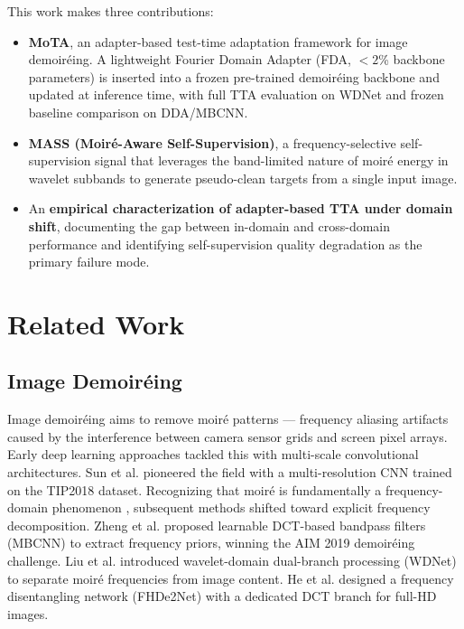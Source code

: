 \documentclass[review,10pt]{elsarticle}
\begin{document}
This work makes three contributions:
\begin{itemize}\raggedright
    \item \textbf{MoTA}, an adapter-based test-time adaptation framework for image demoir\'{e}ing. A lightweight Fourier Domain Adapter (FDA, ${<}2$\% backbone parameters) is inserted into a frozen pre-trained demoir\'{e}ing backbone and updated at inference time, with full TTA evaluation on WDNet and frozen baseline comparison on DDA/MBCNN.
    \item \textbf{MASS (Moir\'{e}-Aware Self-Supervision)}, a frequency-selective self-supervision signal that leverages the band-limited nature of moir\'{e} energy in wavelet subbands to generate pseudo-clean targets from a single input image.
    \item An \textbf{empirical characterization of adapter-based TTA under domain shift}, documenting the gap between in-domain and cross-domain performance and identifying self-supervision quality degradation as the primary failure mode.
\end{itemize}

\section{Related Work}

\subsection{Image Demoir\'{e}ing}

Image demoir\'{e}ing aims to remove moir\'{e} patterns --- frequency aliasing artifacts caused by the interference between camera sensor grids and screen pixel arrays. Early deep learning approaches tackled this with multi-scale convolutional architectures. Sun et al. \cite{sun2018moire} pioneered the field with a multi-resolution CNN trained on the TIP2018 dataset. Recognizing that moir\'{e} is fundamentally a frequency-domain phenomenon \cite{liu2025fourier}, subsequent methods shifted toward explicit frequency decomposition. Zheng et al. \cite{zheng2022learning} proposed learnable DCT-based bandpass filters (MBCNN) to extract frequency priors, winning the AIM 2019 demoir\'{e}ing challenge. Liu et al. \cite{liu2020wavelet} introduced wavelet-domain dual-branch processing (WDNet) to separate moir\'{e} frequencies from image content. He et al. \cite{he2020fhde2net} designed a frequency disentangling network (FHDe2Net) with a dedicated DCT branch for full-HD images.
\end{document}
